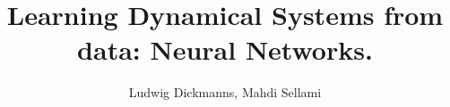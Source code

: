 \usepackage[utf8]{inputenc}
\usepackage{packages}
\usepackage{beamermods}

\usepackage{tikz}
\usepackage{pgfplots}
\usepackage{url}
\usepackage{algorithm2e}
\usepackage{svg}
\usepackage{amsmath}

\usepackage{subfig}


\author[L. Dickmanns, M. Sellami]{Ludwig Dickmanns, Mahdi Sellami}
\title[Learning Dynamical Systems with NNs]{Learning Dynamical Systems from data: Neural Networks.}



\date{}


\usepackage{pgfpages}
\usepackage{ifthen}
\newif\ifsolution%

\makeatletter
\let\@@magyar@captionfix\relax
\makeatother
